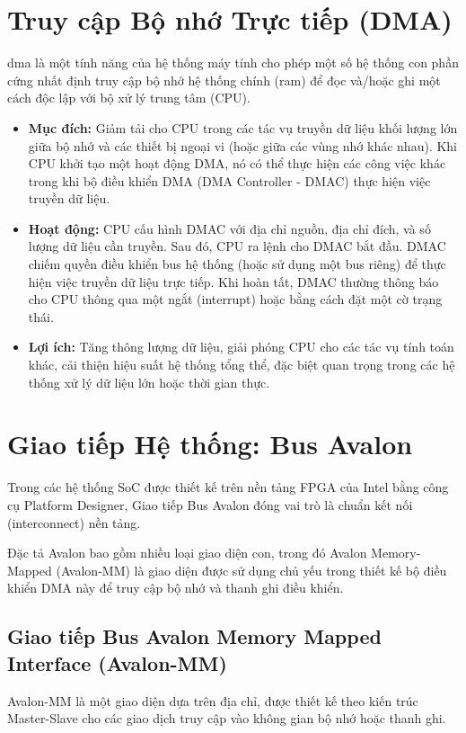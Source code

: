 \section{Truy cập Bộ nhớ Trực tiếp (DMA)}
\acrfull{dma} là một tính năng của hệ thống máy tính cho phép một số hệ thống con phần cứng nhất định truy cập bộ nhớ hệ thống chính (\acrshort{ram}) để đọc và/hoặc ghi một cách độc lập với bộ xử lý trung tâm (CPU).
\begin{itemize}
    \item \textbf{Mục đích:} Giảm tải cho CPU trong các tác vụ truyền dữ liệu khối lượng lớn giữa bộ nhớ và các thiết bị ngoại vi (hoặc giữa các vùng nhớ khác nhau). Khi CPU khởi tạo một hoạt động DMA, nó có thể thực hiện các công việc khác trong khi bộ điều khiển DMA (DMA Controller - DMAC) thực hiện việc truyền dữ liệu.
    \item \textbf{Hoạt động:} CPU cấu hình DMAC với địa chỉ nguồn, địa chỉ đích, và số lượng dữ liệu cần truyền. Sau đó, CPU ra lệnh cho DMAC bắt đầu. DMAC chiếm quyền điều khiển bus hệ thống (hoặc sử dụng một bus riêng) để thực hiện việc truyền dữ liệu trực tiếp. Khi hoàn tất, DMAC thường thông báo cho CPU thông qua một ngắt (interrupt) hoặc bằng cách đặt một cờ trạng thái.
    \item \textbf{Lợi ích:} Tăng thông lượng dữ liệu, giải phóng CPU cho các tác vụ tính toán khác, cải thiện hiệu suất hệ thống tổng thể, đặc biệt quan trọng trong các hệ thống xử lý dữ liệu lớn hoặc thời gian thực.
\end{itemize}

\section{Giao tiếp Hệ thống: Bus Avalon}
\label{sec:avalon_bus}
Trong các hệ thống SoC được thiết kế trên nền tảng FPGA của Intel bằng công cụ Platform Designer, Giao tiếp Bus Avalon đóng vai trò là chuẩn kết nối (interconnect) nền tảng. 

Đặc tả Avalon bao gồm nhiều loại giao diện con, trong đó Avalon Memory-Mapped (Avalon-MM) là giao diện được sử dụng chủ yếu trong thiết kế bộ điều khiển DMA này để truy cập bộ nhớ và thanh ghi điều khiển.

\subsection{Giao tiếp Bus Avalon Memory Mapped Interface (Avalon-MM)}
Avalon-MM là một giao diện dựa trên địa chỉ, được thiết kế theo kiến trúc Master-Slave cho các giao dịch truy cập vào không gian bộ nhớ hoặc thanh ghi.

